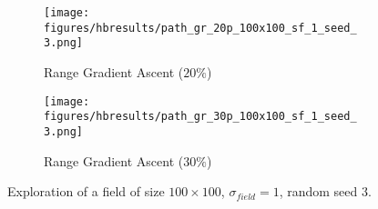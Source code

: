\begin{figure}[htb!]
\begin{subfigure}[t]{0.32\textwidth}
        \centering
        \texttt{[image: figures/hbresults/path\_gr\_20p\_100x100\_sf\_1\_seed\_3.png]}
        \ssp
        \captionsetup{skip=0.20\baselineskip,size=footnotesize}
        \caption{Range Gradient Ascent ($20\%$)}
    \end{subfigure}%
    \begin{subfigure}[t]{0.32\textwidth}
        \centering
        \texttt{[image: figures/hbresults/path\_gr\_30p\_100x100\_sf\_1\_seed\_3.png]}
        \ssp
        \captionsetup{skip=0.20\baselineskip,size=footnotesize}
        \caption{Range Gradient Ascent ($30\%$)}
    \end{subfigure}%
    \ssp
    \captionsetup{skip=0.20\baselineskip}
    \caption{Exploration of a field of size $100 \times 100$, $\sigma_{field} = 1$, random seed 3.}
    \label{fig:s3_sf1}
\end{figure}

\FloatBarrier
\clearpage
